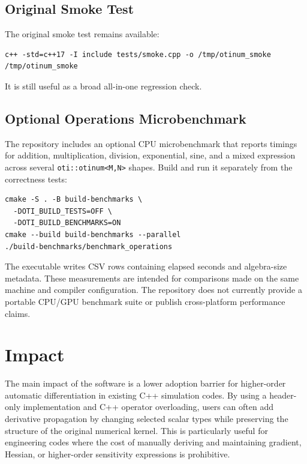 \documentclass[11pt]{article}
\begin{document}
\subsection{Original Smoke Test}

The original smoke test remains available:

\begin{lstlisting}[style=shellstyle]
c++ -std=c++17 -I include tests/smoke.cpp -o /tmp/otinum_smoke
/tmp/otinum_smoke
\end{lstlisting}

It is still useful as a broad all-in-one regression check.

\subsection{Optional Operations Microbenchmark}

The repository includes an optional CPU microbenchmark that reports timings
for addition, multiplication, division, exponential, sine, and a mixed
expression across several \texttt{oti::otinum<M,N>} shapes. Build and run it
separately from the correctness tests:

\begin{lstlisting}[style=shellstyle]
cmake -S . -B build-benchmarks \
  -DOTI_BUILD_TESTS=OFF \
  -DOTI_BUILD_BENCHMARKS=ON
cmake --build build-benchmarks --parallel
./build-benchmarks/benchmark_operations
\end{lstlisting}

The executable writes CSV rows containing elapsed seconds and algebra-size
metadata. These measurements are intended for comparisons made on the same
machine and compiler configuration. The repository does not currently provide
a portable CPU/GPU benchmark suite or publish cross-platform performance
claims.

\section{Impact}

The main impact of the software is a lower adoption barrier for higher-order
automatic differentiation in existing C++ simulation codes. By using a
header-only implementation and C++ operator overloading, users can often add
derivative propagation by changing selected scalar types while preserving the
structure of the original numerical kernel. This is particularly useful for
engineering codes where the cost of manually deriving and maintaining
gradient, Hessian, or higher-order sensitivity expressions is prohibitive.
\end{document}
